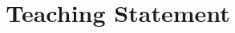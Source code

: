 \documentclass[9pt,a4paper]{article}
\author{ }
\begin{document}
\title {Teaching Statement}
\date{}
\maketitle

\clearpage
\end{document}
